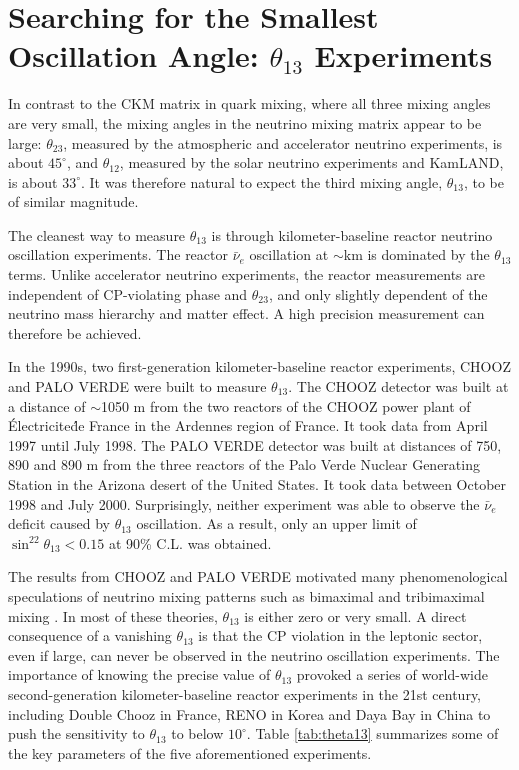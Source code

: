 \section{Searching for the Smallest Oscillation Angle: $\theta_{13}$ Experiments} 
\label{sec:theta13}
In contrast to the CKM matrix in quark mixing, where all three mixing angles are very small, the mixing angles in the neutrino mixing matrix appear to be large: $\theta_{23}$, measured by the atmospheric and accelerator neutrino experiments, is about $45^\circ$, and $\theta_{12}$, measured by the solar neutrino experiments and KamLAND, is about $33^\circ$. It was therefore natural to expect the third mixing angle, $\theta_{13}$, to be of similar magnitude.

The cleanest way to measure $\theta_{13}$ is through kilometer-baseline reactor neutrino oscillation experiments. The reactor $\bar\nu_e$ oscillation at $\sim$km is dominated by the $\theta_{13}$ terms. Unlike accelerator neutrino experiments, the reactor measurements are independent of CP-violating phase and $\theta_{23}$, and only slightly dependent of the neutrino mass hierarchy and matter effect. A high precision measurement can therefore be achieved. 

In the 1990s, two first-generation kilometer-baseline reactor experiments, CHOOZ \cite{Chooz} and PALO VERDE \cite{Paloverde} were built to measure $\theta_{13}$. The CHOOZ detector was built at a distance of $\sim$1050 m from the two reactors of the CHOOZ power plant of \'{E}lectricite\'{d}e France in the Ardennes region of France. It took data from April 1997 until July 1998. The PALO VERDE detector was built at distances of 750, 890 and 890 m from the three reactors of the Palo Verde Nuclear Generating Station in the Arizona desert of the United States. It took data between October 1998 and July 2000. Surprisingly, neither experiment was able to observe the $\bar\nu_e$ deficit caused by $\theta_{13}$ oscillation. As a result, only an upper limit of $\sin^22\theta_{13} < 0.15$ at 90\% C.L. was obtained.

The results from CHOOZ and PALO VERDE motivated many phenomenological speculations of neutrino mixing patterns such as bimaximal and tribimaximal mixing \cite{Harrison,Altarelli}. In most of these theories, $\theta_{13}$ is either zero or very small. A direct consequence of a vanishing $\theta_{13}$ is that the CP violation in the leptonic sector, even if large, can never be observed in the neutrino oscillation experiments. The importance of knowing the precise value of $\theta_{13}$ provoked a series of world-wide second-generation kilometer-baseline reactor experiments in the 21st century, including Double Chooz \cite{DChooz} in France, RENO \cite{Reno} in Korea and Daya Bay \cite{Dayabay} in China to push the sensitivity to $\theta_{13}$ to below $10^\circ$. Table \ref{tab:theta13} summarizes some of the key parameters of the five aforementioned experiments.

